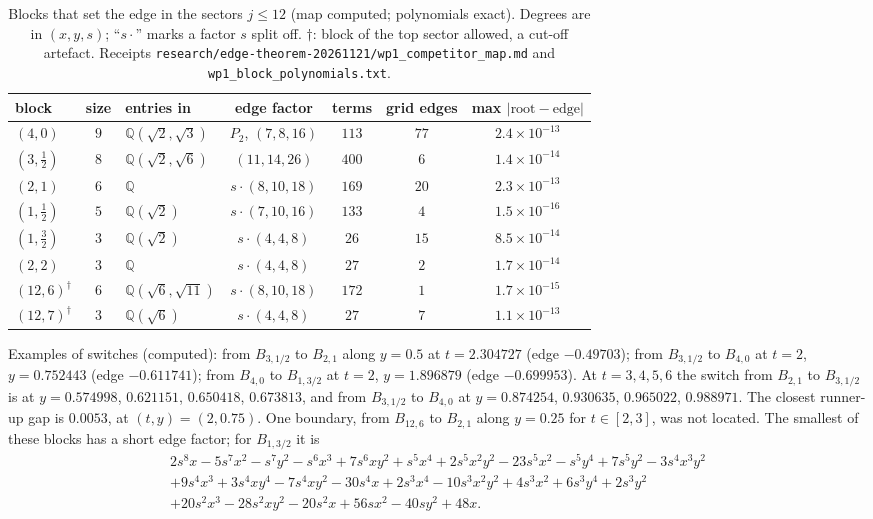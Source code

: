 \documentclass[11pt]{article}
\theoremstyle{definition}
\theoremstyle{remark}
\begin{document}
\begin{table}[ht]
\centering
\small
\caption{Blocks that set the edge in the sectors $j\le12$ (map computed; polynomials exact). Degrees are in
$(x,y,s)$; ``$s\cdot$'' marks a factor $s$ split off. $\dagger$: block of the top sector allowed, a cut-off
artefact. Receipts \texttt{research/edge-theorem-20261121/}\allowbreak\texttt{wp1\_competitor\_map.md} and
\texttt{wp1\_block\_polynomials.txt}.}
\label{tab:competitors}
\begin{tabular}{@{}lclcccc@{}}
\toprule
block & size & entries in & edge factor & terms & grid edges & max $|\text{root}-\text{edge}|$\\
\midrule
$(4,0)$ & $9$ & $\mathbb Q(\sqrt2,\sqrt3)$ & $P_2$, $(7,8,16)$ & $113$ & $77$ & $2.4\times10^{-13}$\\
$(3,\tfrac12)$ & $8$ & $\mathbb Q(\sqrt2,\sqrt6)$ & $(11,14,26)$ & $400$ & $6$ & $1.4\times10^{-14}$\\
$(2,1)$ & $6$ & $\mathbb Q$ & $s\cdot(8,10,18)$ & $169$ & $20$ & $2.3\times10^{-13}$\\
$(1,\tfrac12)$ & $5$ & $\mathbb Q(\sqrt2)$ & $s\cdot(7,10,16)$ & $133$ & $4$ & $1.5\times10^{-16}$\\
$(1,\tfrac32)$ & $3$ & $\mathbb Q(\sqrt2)$ & $s\cdot(4,4,8)$ & $26$ & $15$ & $8.5\times10^{-14}$\\
$(2,2)$ & $3$ & $\mathbb Q$ & $s\cdot(4,4,8)$ & $27$ & $2$ & $1.7\times10^{-14}$\\
$(12,6)^\dagger$ & $6$ & $\mathbb Q(\sqrt6,\sqrt{11})$ & $s\cdot(8,10,18)$ & $172$ & $1$ & $1.7\times10^{-15}$\\
$(12,7)^\dagger$ & $3$ & $\mathbb Q(\sqrt6)$ & $s\cdot(4,4,8)$ & $27$ & $7$ & $1.1\times10^{-13}$\\
\bottomrule
\end{tabular}
\end{table}

Examples of switches (computed): from $B_{3,1/2}$ to $B_{2,1}$ along $y=0.5$ at $t=2.304727$ (edge $-0.49703$); from
$B_{3,1/2}$ to $B_{4,0}$ at $t=2$, $y=0.752443$ (edge $-0.611741$); from $B_{4,0}$ to $B_{1,3/2}$ at $t=2$, $y=1.896879$
(edge $-0.699953$). At $t=3,4,5,6$ the switch from $B_{2,1}$ to $B_{3,1/2}$ is at $y=0.574998$, $0.621151$, $0.650418$,
$0.673813$, and from $B_{3,1/2}$ to $B_{4,0}$ at $y=0.874254$, $0.930635$, $0.965022$, $0.988971$. The closest runner-up
gap is $0.0053$, at $(t,y)=(2,0.75)$. One boundary, from $B_{12,6}$ to $B_{2,1}$ along $y=0.25$ for $t\in[2,3]$, was not
located. The smallest of these blocks has a short edge factor; for $B_{1,3/2}$ it is
\begin{multline*}
2s^8x-5s^7x^2-s^7y^2-s^6x^3+7s^6xy^2+s^5x^4+2s^5x^2y^2-23s^5x^2-s^5y^4+7s^5y^2-3s^4x^3y^2\\
+9s^4x^3+3s^4xy^4-7s^4xy^2-30s^4x+2s^3x^4-10s^3x^2y^2+4s^3x^2+6s^3y^4+2s^3y^2\\
+20s^2x^3-28s^2xy^2-20s^2x+56sx^2-40sy^2+48x .
\end{multline*}
\end{document}
